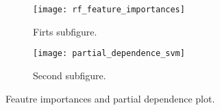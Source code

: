 \begin{figure}
    \begin{tcolorbox}[arc=0pt,boxrule=0.5pt]
        \centering
        \begin{subfigure}{0.45\textwidth}
            \texttt{[image: rf\_feature\_importances]}
            \caption{Firts subfigure.}
            \label{fig:feature_impoartances_rf}
        \end{subfigure}
        \hfill
        \begin{subfigure}{0.45\textwidth}
            \texttt{[image: partial\_dependence\_svm]}
            \caption{Second subfigure.}
            \label{fig:partial_dependence_svm}
        \end{subfigure}
        \hfill

        \caption{Feautre importances and partial dependence plot.}
        \label{fig:figures}
    \end{tcolorbox}
\end{figure}


